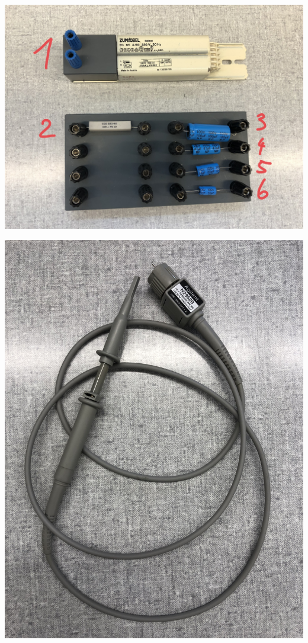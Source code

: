 \documentclass[11pt,ngerman]{scrartcl}
\begin{document}
\begin{minipage}{\textwidth}
	\begin{minipage}[t]{0.5\textwidth}
		\centering
		\includegraphics[width=\textwidth]{kapa}
		\label{fig:steck}
	\end{minipage}
	\vspace{2mm}
	\begin{minipage}[t]{0.5\textwidth}
		\centering
		\includegraphics[width=\textwidth]{tastkabel}
		\label{fig:tastkabel}
	\end{minipage}
	\vspace{1em}
\end{minipage}
\end{document}
